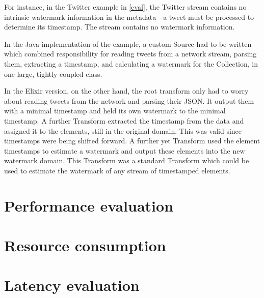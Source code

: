 For instance, in the Twitter example in \cref{eval}, the Twitter stream contains no intrinsic watermark information in the metadata---a tweet must be processed to determine its timestamp.
The stream contains no watermark information.

In the Java implementation of the example, a custom Source had to be written which combined responsibility for reading tweets from a network stream, parsing them, extracting a timestamp, and calculating a watermark for the Collection, in one large, tightly coupled class.

In the Elixir version, on the other hand, the root transform only had to worry about reading tweets from the network and parsing their JSON.
It output them with a minimal timestamp and held its own watermark to the minimal timestamp.
A further Transform extracted the timestamp from the data and assigned it to the elements, still in the original domain.
This was valid since timestamps were being shifted forward.
A further yet Transform used the element timestamps to estimate a watermark and output these elements into the new watermark domain.
This Transform was a standard Transform which could be used to estimate the watermark of any stream of timestamped elements.


\section{Performance evaluation}\label{sec:eval:performance}

\section{Resource consumption}\label{sec:eval:resource}

\section{Latency evaluation}\label{sec:eval:latency}

